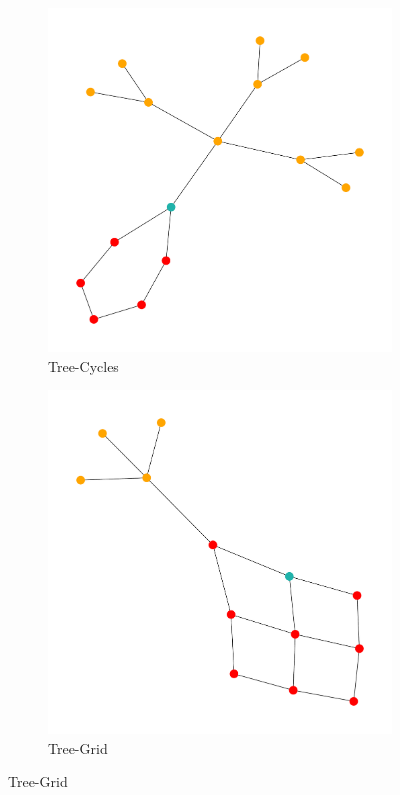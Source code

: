 \begin{figure}[H]
    \vspace{0.5cm}
    
    \begin{subfigure}[b]{0.4\textwidth}
        \includegraphics[width=\textwidth]{img/Tree-Cycles-VIS-COMP-GRAPH.pdf}
        \caption{Tree-Cycles}
    \end{subfigure}
    \hfill
    \begin{subfigure}[b]{0.4\textwidth}
        \includegraphics[width=\textwidth]{img/Tree-Grid-VIS-COMP-GRAPH.pdf}
        \caption{Tree-Grid}
    \end{subfigure}
    

\end{figure}
